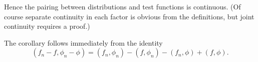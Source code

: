 Hence the pairing between distributions and test functions is continuous. (Of course separate continuity in each factor is obvious from the definitions, but joint continuity requires a proof.)

\begin{Proof}
The corollary follows immediately from the identity
\begin{equation}\label{eq:distribution-joint-pairing-identity}
(f_n-f,\phi_n-\phi)=(f_n,\phi_n)-(f,\phi_n)-(f_n,\phi)+(f,\phi).
\end{equation}

\end{Proof}
